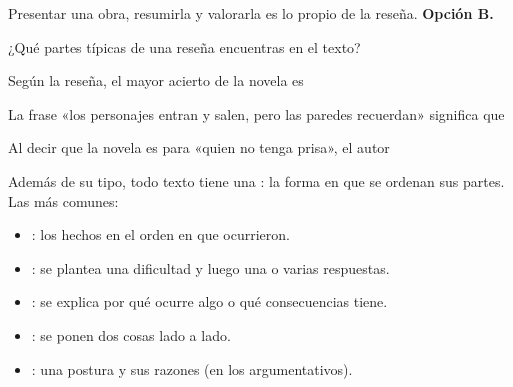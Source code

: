 \begin{retoresuelto}
Presentar una obra, resumirla y valorarla es lo propio de la reseña. \textbf{Opción B.}
\end{retoresuelto}

\taller
{}
\begin{ejercicios}
\item ¿Qué partes típicas de una reseña encuentras en el texto? 
\end{ejercicios}
\begin{ejercicios}
\item Según la reseña, el mayor acierto de la novela es
\item La frase «los personajes entran y salen, pero las paredes recuerdan»  significa que
\item Al decir que la novela es para «quien no tenga prisa», el autor
\end{ejercicios}

\bitacora


Además de su tipo, todo texto tiene una : la forma en que se ordenan sus partes. Las más comunes:
\begin{itemize}
  \item {}: los hechos en el orden en que ocurrieron.
  \item {}: se plantea una dificultad y luego una o varias respuestas.
  \item {}: se explica por qué ocurre algo o qué consecuencias tiene.
  \item {}: se ponen dos cosas lado a lado.
  \item {}: una postura y sus razones (en los argumentativos).
\end{itemize}

